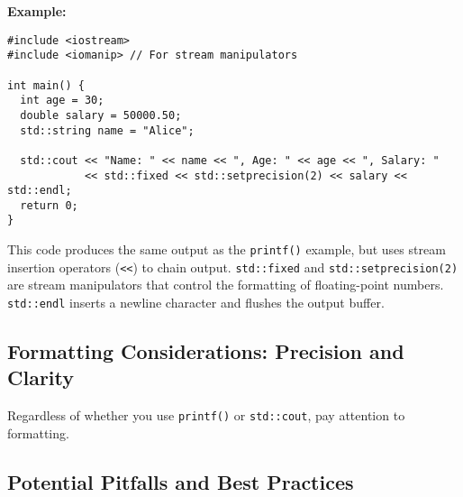 \documentclass{article}
\begin{document}
{{{{\textbf{Example:}

\begin{verbatim}
#include <iostream>
#include <iomanip> // For stream manipulators

int main() {
  int age = 30;
  double salary = 50000.50;
  std::string name = "Alice";

  std::cout << "Name: " << name << ", Age: " << age << ", Salary: "
            << std::fixed << std::setprecision(2) << salary << std::endl;
  return 0;
}
\end{verbatim}

This code produces the same output as the \texttt{printf()} example, but uses stream insertion operators (\texttt{<<}) to chain output.  \texttt{std::fixed} and \texttt{std::setprecision(2)} are stream manipulators that control the formatting of floating-point numbers. \texttt{std::endl} inserts a newline character and flushes the output buffer.

\subsection*{Formatting Considerations: Precision and Clarity}

Regardless of whether you use \texttt{printf()} or \texttt{std::cout}, pay attention to formatting.


\subsection*{Potential Pitfalls and Best Practices}

}}}}
\end{document}
